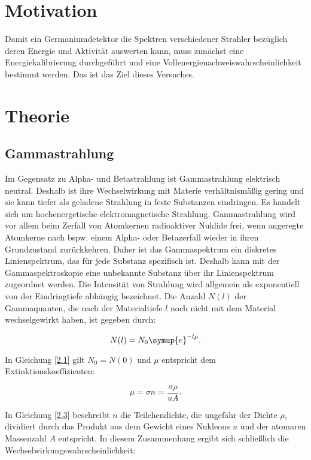 \section{Motivation}
Damit ein Germaniumdetektor die Spektren verschiedener Strahler bezüglich deren
Energie und Aktivität auswerten kann, muss zunächst eine Energiekalibrierung 
durchgeführt und
eine Vollenergienachweiswahrscheinlichkeit bestimmt werden. 
Das ist das Ziel dieses Versuches.

\section{Theorie}
\label{sec:Theorie}

\subsection{Gammastrahlung}
Im Gegensatz zu Alpha- und Betastrahlung ist Gammastrahlung elektrisch neutral. 
Deshalb ist ihre Wechselwirkung mit Materie verhältnismäßig gering und sie 
kann tiefer als geladene Strahlung in feste Substanzen eindringen.
Es handelt sich um hochenergetische elektromagnetische Strahlung.
Gammastrahlung wird vor allem beim Zerfall von Atomkernen radioaktiver Nuklide frei, 
wenn angeregte Atomkerne nach bspw. einem Alpha- oder Betazerfall wieder in ihren 
Grundzustand zurückkehren.
Daher ist das Gammaspektrum ein diskretes Linienspektrum, das für jede Substanz 
spezifisch ist. Deshalb kann mit der Gammaspektroskopie eine unbekannte Substanz über 
ihr Linienspektrum zugeordnet werden.
Die Intensität von Strahlung wird allgemein als exponentiell von der 
Eindringtiefe abhängig bezeichnet. 
Die Anzahl $N(l)$ der Gammaquanten, die nach der Materialtiefe $l$ noch nicht mit dem 
Material wechselgewirkt haben, ist gegeben durch:

\begin{equation}
    N(l) = N_0 \symup{e}^{-l\mu}.
    \label{2.1}
\end{equation}

In Gleichung \ref{2.1} gilt $N_0 = N(0)$ und $\mu$ entspricht dem Extinktionskoeffizienten:

\begin{equation}
    \mu = \sigma n = \frac{\sigma \rho}{uA}.
    \label{2.3}
\end{equation}

In Gleichung \ref{2.3} beschreibt $n$ die Teilchendichte, die ungefähr der 
Dichte $\rho$, dividiert durch das Produkt aus dem Gewicht eines Nukleons $u$
und der atomaren Massenzahl $A$  entspricht.
In diesem Zusammenhang ergibt sich schließlich die 
Wechselwirkungswahrscheinlichkeit:


